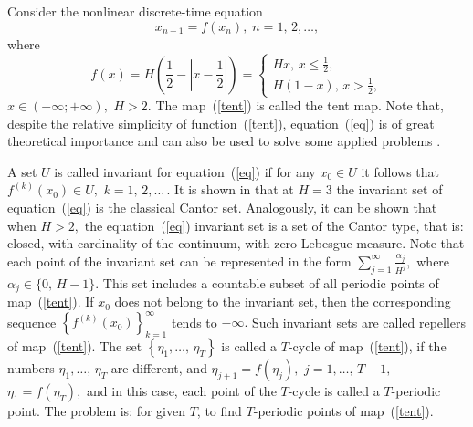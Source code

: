 \documentclass[12pt,a4paper]{amsart}
\begin{document}
\section{}

Consider the nonlinear discrete-time equation
\begin{equation}\label{eq}
x_{n+1}=f(x_n),\;n=1,\,2,\ldots,
\end{equation}
where 
\begin{equation}\label{tent}
f(x)=H\left(\frac12-\left|x-\frac12\right|\right)=
\left\{\begin{array}{ll}
Hx,\,x\leq\frac12, \\
H(1-x),\,x>\frac12,
\end{array}\right.
\end{equation}
$x\in(-\infty;+\infty),$ $H>2.$ The map~(\ref{tent}) is called the tent map. Note that, despite the relative simplicity of function~(\ref{tent}), 
equation~(\ref{eq}) is of great theoretical importance and can also be used to solve some applied problems \cite{Derr, Goh}.

A set $U$ is called invariant for equation~(\ref{eq}) if for any $x_0\in U$ it follows that $f^{(k)}(x_0)\in U,$ $k=1,\,2,\ldots\,.$ It is shown in \cite{Leonov}
that at $H=3$ the invariant set of equation~(\ref{eq}) is the classical Cantor set. Analogously, it can be shown that when $H>2,$ the equation~(\ref{eq}) 
invariant set is a set of the Cantor type, that is: closed, with cardinality of the continuum, with zero Lebesgue measure. Note that each point of the invariant 
set can be represented in the form $\sum\limits_{j=1}^{\infty}{\frac{\alpha_j}{H^j}},$ where $\alpha_j\in\{0,\,H-1\}.$ This set includes a countable subset 
of all periodic points of map~(\ref{tent}). If $x_0$ does not belong to the invariant set, then the corresponding sequence 
$\left\{f^{(k)}(x_0)\right\}_{k=1}^{\infty}$ tends to $-\infty.$ Such invariant sets are called repellers of map~(\ref{tent}). The set 
$\left\{\eta_1,\ldots,\,\eta_T\right\}$ is called a $T$-cycle of map~(\ref{tent}), if the numbers $\eta_1,\ldots,\,\eta_T$ are different, and 
$\eta_{j+1}=f(\eta_j),$ $j=1,\ldots,\,T-1,$ $\eta_1=f(\eta_T),$ and in this case, each point of the $T$-cycle is called a $T$-periodic point. The problem is: 
for given $T$, to find $T$-periodic points of map~(\ref{tent}).



\section{}
\end{document}
